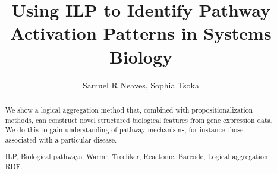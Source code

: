 \documentclass[runningheads,a4paper]{llncs}
\newcommand{\keywords}[1]{\par\addvspace\baselineskip
\noindent\keywordname\enspace\ignorespaces#1}
\begin{document}
\mainmatter  %

%
\title{Using ILP to Identify Pathway Activation Patterns in Systems Biology}

%
%
\author{Samuel R Neaves, Sophia Tsoka}
%


%
%

\maketitle


\begin{abstract}
We show a logical aggregation method that, combined with
propositionalization methods, can construct novel structured biological
features from gene expression data. We do this to gain understanding of pathway
mechanisms, for instance those associated with a particular disease.

\keywords{ILP, Biological pathways, Warmr, Treeliker, Reactome, Barcode, Logical aggregation, RDF.}
\end{abstract}
\end{document}
